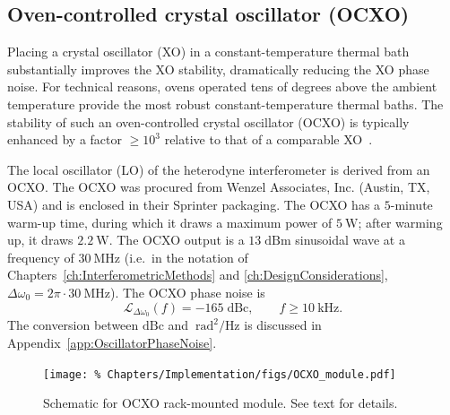 \subsection{Oven-controlled crystal oscillator (OCXO)}
\label{sec:Implementation:Hardware:OCXO}
Placing a crystal oscillator (XO) in a constant-temperature thermal bath
substantially improves the XO stability,
dramatically reducing the XO phase noise.
For technical reasons,
ovens operated tens of degrees above the ambient temperature
provide the most robust constant-temperature thermal baths.
The stability of such an oven-controlled crystal oscillator (OCXO)
is typically enhanced by a factor $\geq 10^3$
relative to that of a comparable XO~\cite[Table~7.2]{horowitz_and_hill}.

The local oscillator (LO) of the heterodyne interferometer
is derived from an OCXO.
The OCXO was procured from Wenzel Associates, Inc. (Austin, TX, USA)
and is enclosed in their Sprinter packaging.
The OCXO has a $5$-minute warm-up time,
during which it draws a maximum power of $\SI{5}{\watt}$;
after warming up, it draws $\SI{2.2}{\watt}$.
The OCXO output is a $13 \; \text{dBm}$ sinusoidal wave
at a frequency of $\SI{30}{\mega\hertz}$
(i.e.\ in the notation of
Chapters~\ref{ch:InterferometricMethods} and \ref{ch:DesignConsiderations},
$\Delta \omega_0 = 2 \pi \cdot \SI{30}{\mega\hertz}$).
The OCXO phase noise is
\begin{equation}
    \mathcal{L}_{\Delta \omega_0}(f)
    =
    -165 \; \text{dBc},
    \qquad
    f \geq \SI{10}{\kilo\hertz}.
  \label{eq:Implementation:OCXO_phase_noise}
\end{equation}
The conversion between $\text{dBc}$ and
$\SI{}{\radian\squared\per\hertz}$ is discussed
in Appendix~\ref{app:OscillatorPhaseNoise}.

\begin{figure}
  \centering
  \texttt{[image: \%
    Chapters/Implementation/figs/OCXO\_module.pdf]}
  \caption[Schematic for OCXO rack-mounted module]{%
    Schematic for OCXO rack-mounted module. See text for details.}
  \label{fig:Implementation:OCXO_module}
\end{figure}

